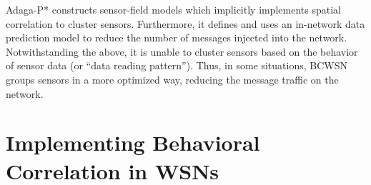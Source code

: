 \documentclass{acm_proc_article-sp}
\begin{document}

Adaga-P* \cite{MaiaACR2013} constructs sensor-field models which
implicitly implements spatial correlation to cluster sensors. Furthermore, it
defines and uses an in-network data prediction model to reduce the number of
messages injected into the network. Notwithstanding the above, it is unable
to cluster sensors based on the behavior of sensor data (or ``data reading
pattern''). Thus, in some situations, BCWSN groups sensors in a more
optimized way, reducing the message traffic on the network.

\section{Implementing Behavioral Correlation in WSNs}
\label{implementing-bcwsn}
\end{document}
